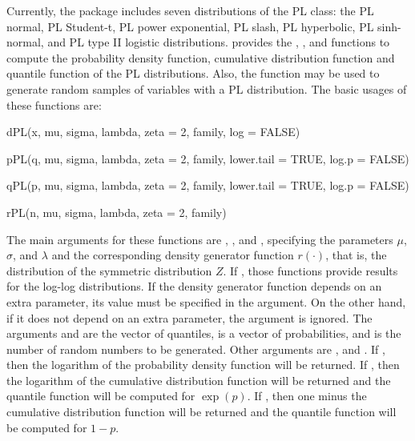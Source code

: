Currently, the  package includes seven distributions of the PL class: the PL normal, PL Student-t, PL power exponential, PL slash, PL hyperbolic, PL sinh-normal, and PL type II logistic distributions.  provides the , , and  functions to compute the probability density function, cumulative distribution function and quantile function of the PL distributions. Also, the  function may be used to generate random samples of variables with a PL distribution. The basic usages of these functions are:
\begin{Scode}
dPL(x, mu, sigma, lambda, zeta = 2, family, log = FALSE)

pPL(q, mu, sigma, lambda, zeta = 2, family, lower.tail = TRUE, log.p = FALSE)

qPL(p, mu, sigma, lambda, zeta = 2, family, lower.tail = TRUE, log.p = FALSE)

rPL(n, mu, sigma, lambda, zeta = 2, family)
\end{Scode}
The main arguments for these functions are , ,  and , specifying the parameters $\mu$, $\sigma$, and $\lambda$ and the corresponding density generator function $r(\cdot)$, that is, the distribution of the symmetric distribution $Z$. If , those functions provide results for the log-log distributions. If the density generator function depends on an extra parameter, its value must be specified in the  argument. On the other hand, if it does not depend on an extra parameter, the argument  is ignored. The arguments  and  are the vector of quantiles,  is a vector of probabilities, and  is the number of random numbers to be generated. Other arguments are ,  and . If , then the logarithm of the probability density function will be returned. If , then the logarithm of the cumulative distribution function will be returned and the quantile function will be computed for $\exp(p)$. If , then one minus the cumulative distribution function will be returned and the quantile function will be computed for $1-p$. 


